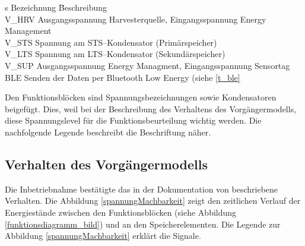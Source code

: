 \begin{minipage}{\textwidth}
    \begin{tabbing}s
        Bezeichnung \quad\= Beschreibung\\[0.8ex]
        V\_HRV \> Ausgangsspannung Harvesterquelle, Eingangsspannung Energy Management\\
        V\_STS\> Spannung am STS--Kondensator (Primärspeicher)\\
        V\_LTS\> Spannung am LTS--Kondensator (Sekundärspeicher)\\
        V\_SUP\> Ausgangsspannung Energy Managment, Eingangsspannung Sensortag\\
        BLE \> Senden der Daten per Bluetooth Low Energy (siehe \ref{t_ble} \\
    \end{tabbing} 
\end{minipage}

Den Funktionsblöcken sind Spannungsbezeichnungen sowie Kondensatoren beigefügt. Dies, weil bei der Beschreibung des Verhaltens des Vorgängermodells, diese Spannungslevel für die Funktionsbeurteilung wichtig werden. Die nachfolgende Legende beschreibt die Beschriftung näher.

  

\subsection{Verhalten des Vorgängermodells}\label{verhalten} 

Die Inbetriebnahme bestätigte das in der Dokumentation von \cite{PA_bicycle} beschriebene Verhalten. Die Abbildung \ref{spannungMachbarkeit} zeigt den zeitlichen Verlauf der Energiestände zwischen den Funktionsblöcken (siehe Abbildung \ref{funktionsdiagramm_bild}) und an den Speicherelementen. Die Legende zur Abbildung  \ref{spannungMachbarkeit} erklärt die Signale.

